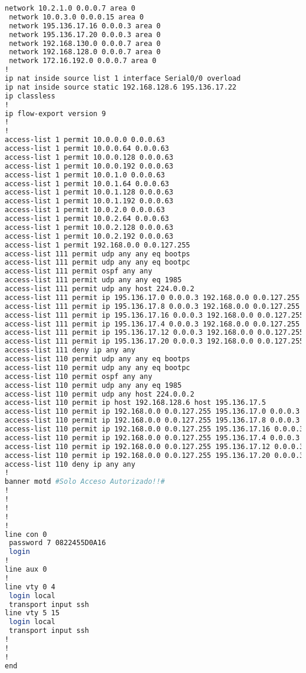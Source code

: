 \begin{lstlisting}[language=Bash, caption={Configuración Completa Router Auxiliar 2}]
 network 10.2.1.0 0.0.0.7 area 0
 network 10.0.3.0 0.0.0.15 area 0
 network 195.136.17.16 0.0.0.3 area 0
 network 195.136.17.20 0.0.0.3 area 0
 network 192.168.130.0 0.0.0.7 area 0
 network 192.168.128.0 0.0.0.7 area 0
 network 172.16.192.0 0.0.0.7 area 0
!
ip nat inside source list 1 interface Serial0/0 overload
ip nat inside source static 192.168.128.6 195.136.17.22 
ip classless
!
ip flow-export version 9
!
!
access-list 1 permit 10.0.0.0 0.0.0.63
access-list 1 permit 10.0.0.64 0.0.0.63
access-list 1 permit 10.0.0.128 0.0.0.63
access-list 1 permit 10.0.0.192 0.0.0.63
access-list 1 permit 10.0.1.0 0.0.0.63
access-list 1 permit 10.0.1.64 0.0.0.63
access-list 1 permit 10.0.1.128 0.0.0.63
access-list 1 permit 10.0.1.192 0.0.0.63
access-list 1 permit 10.0.2.0 0.0.0.63
access-list 1 permit 10.0.2.64 0.0.0.63
access-list 1 permit 10.0.2.128 0.0.0.63
access-list 1 permit 10.0.2.192 0.0.0.63
access-list 1 permit 192.168.0.0 0.0.127.255
access-list 111 permit udp any any eq bootps
access-list 111 permit udp any any eq bootpc
access-list 111 permit ospf any any
access-list 111 permit udp any any eq 1985
access-list 111 permit udp any host 224.0.0.2
access-list 111 permit ip 195.136.17.0 0.0.0.3 192.168.0.0 0.0.127.255
access-list 111 permit ip 195.136.17.8 0.0.0.3 192.168.0.0 0.0.127.255
access-list 111 permit ip 195.136.17.16 0.0.0.3 192.168.0.0 0.0.127.255
access-list 111 permit ip 195.136.17.4 0.0.0.3 192.168.0.0 0.0.127.255
access-list 111 permit ip 195.136.17.12 0.0.0.3 192.168.0.0 0.0.127.255
access-list 111 permit ip 195.136.17.20 0.0.0.3 192.168.0.0 0.0.127.255
access-list 111 deny ip any any
access-list 110 permit udp any any eq bootps
access-list 110 permit udp any any eq bootpc
access-list 110 permit ospf any any
access-list 110 permit udp any any eq 1985
access-list 110 permit udp any host 224.0.0.2
access-list 110 permit ip host 192.168.128.6 host 195.136.17.5
access-list 110 permit ip 192.168.0.0 0.0.127.255 195.136.17.0 0.0.0.3
access-list 110 permit ip 192.168.0.0 0.0.127.255 195.136.17.8 0.0.0.3
access-list 110 permit ip 192.168.0.0 0.0.127.255 195.136.17.16 0.0.0.3
access-list 110 permit ip 192.168.0.0 0.0.127.255 195.136.17.4 0.0.0.3
access-list 110 permit ip 192.168.0.0 0.0.127.255 195.136.17.12 0.0.0.3
access-list 110 permit ip 192.168.0.0 0.0.127.255 195.136.17.20 0.0.0.3
access-list 110 deny ip any any
!
banner motd #Solo Acceso Autorizado!!#
!
!
!
!
!
line con 0
 password 7 0822455D0A16
 login
!
line aux 0
!
line vty 0 4
 login local
 transport input ssh
line vty 5 15
 login local
 transport input ssh
!
!
!
end


\end{lstlisting}

